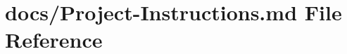\hypertarget{_project-_instructions_8md}{}\section{docs/\+Project-\/\+Instructions.md File Reference}
\label{_project-_instructions_8md}
